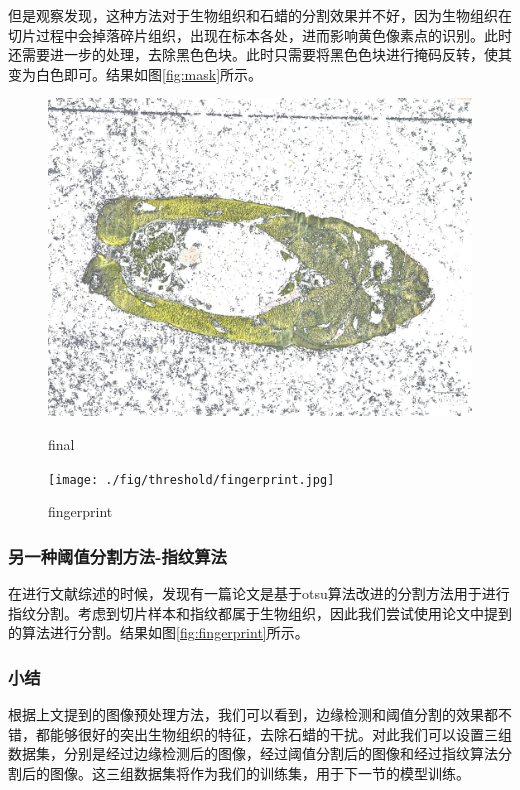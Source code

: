 但是观察发现，这种方法对于生物组织和石蜡的分割效果并不好，因为生物组织在切片过程中会掉落碎片组织，出现在标本各处，进而影响黄色像素点的识别。此时还需要进一步的处理，去除黑色色块。此时只需要将黑色色块进行掩码反转，使其变为白色即可。结果如图\autoref{fig:mask}所示。

\begin{figure}
    \centering
    \begin{minipage}{0.4\textwidth}
        \centering
        \includegraphics[width=\textwidth]{./fig/threshold/final.jpg}
        \caption{final}
        \label{fig:mask}
    \end{minipage}
    \begin{minipage}{0.4\textwidth}
        \centering
        \texttt{[image: ./fig/threshold/fingerprint.jpg]}
        \caption{fingerprint}
        \label{fig:fingerprint}
    \end{minipage}
\end{figure}

\subsubsection{另一种阈值分割方法-指纹算法}
在进行文献综述的时候，发现有一篇论文是基于otsu算法改进的分割方法用于进行指纹分割。考虑到切片样本和指纹都属于生物组织，因此我们尝试使用论文中提到的算法进行分割。结果如图\autoref{fig:fingerprint}所示。

\subsubsection{小结}
根据上文提到的图像预处理方法，我们可以看到，边缘检测和阈值分割的效果都不错，都能够很好的突出生物组织的特征，去除石蜡的干扰。对此我们可以设置三组数据集，分别是经过边缘检测后的图像，经过阈值分割后的图像和经过指纹算法分割后的图像。这三组数据集将作为我们的训练集，用于下一节的模型训练。

